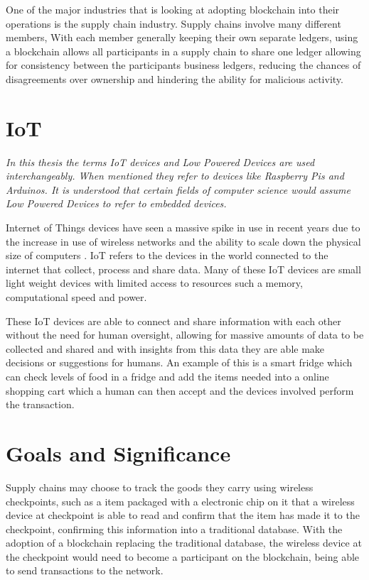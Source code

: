 One of the major industries that is looking at adopting blockchain into their operations is the supply chain industry. Supply chains involve many different members, With each member generally keeping their own separate ledgers, using a blockchain allows all participants in a supply chain to share one ledger allowing for consistency between the participants business ledgers, reducing the chances of disagreements over ownership and hindering the ability for malicious activity.


\section{IoT}

\textit{In this thesis the terms IoT devices and Low Powered Devices are used interchangeably. When mentioned they refer to devices like Raspberry Pis and Arduinos. It is understood that certain fields of computer science would assume Low Powered Devices to refer to embedded devices.}

Internet of Things devices have seen a massive spike in use in recent years due to the increase in use of wireless networks and the ability to scale down the physical size of computers \cite{ManagingIOTbc}. IoT refers to the devices in the world connected to the internet that collect, process and share data. Many of these IoT devices are small light weight devices with limited access to resources such a memory, computational speed and power. 

These IoT devices are able to connect and share information with each other without the need for human oversight, allowing for massive amounts of data to be collected and shared and with insights from this data they are able make decisions or suggestions for humans. An example of this is a smart fridge which can check levels of food in a fridge and add the items needed into a online shopping cart which a human can then accept and the devices involved perform the transaction.


\section{Goals and Significance}

Supply chains may choose to track the goods they carry using wireless checkpoints, such as a item packaged with a electronic chip on it that a wireless device at checkpoint is able to read and confirm that the item has made it to the checkpoint, confirming this information into a traditional database. With the adoption of a blockchain replacing the traditional database, the wireless device at the checkpoint would need to become a participant on the blockchain, being able to send transactions to the network.

